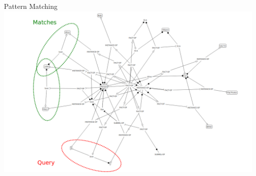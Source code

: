 \documentclass[pdf]
{beamer}
\begin{document}
\begin{frame}{Pattern Matching}
    \centering
    \includegraphics[width=\textwidth]{pics/QueryGraphModified.png}
\end{frame}


\end{document}
